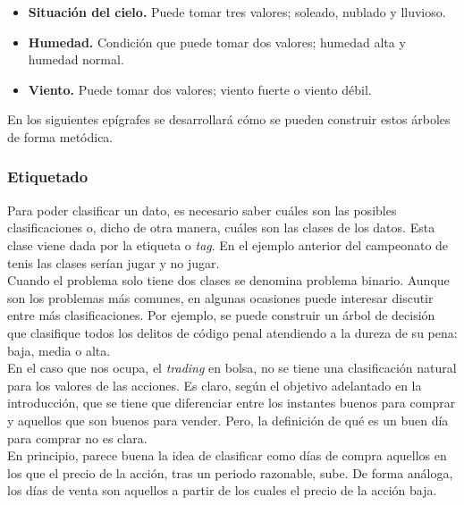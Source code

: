 			\begin{itemize}
				\item \textbf{Situaci\'on del cielo.} Puede tomar tres valores; soleado, nublado y lluvioso.
				
				\item \textbf{Humedad.} Condici\'on que puede tomar dos valores; humedad alta y humedad normal.
				
				\item \textbf{Viento.} Puede tomar dos valores; viento fuerte o viento d\'ebil.
			\end{itemize}
		
			En los siguientes ep\'igrafes se desarrollar\'a c\'omo se pueden construir estos \'arboles de forma met\'odica.\\
			 
			\subsubsection{Etiquetado}
			Para poder clasificar un dato, es necesario saber cu\'ales son las posibles clasificaciones o, dicho de otra manera, cu\'ales son las clases de los datos. Esta clase viene dada por la etiqueta o \textit{tag}. En el ejemplo anterior del campeonato de tenis las clases ser\'ian jugar y no jugar.\\
			
			Cuando el problema solo tiene dos clases se denomina problema binario. Aunque son los problemas m\'as comunes, en algunas ocasiones puede interesar discutir entre m\'as clasificaciones. Por ejemplo, se puede construir un \'arbol de decisi\'on que clasifique todos los delitos de c\'odigo penal atendiendo a la dureza de su pena: baja, media o alta.\\
			
			En el caso que nos ocupa, el \textit{trading} en bolsa, no se tiene una clasificaci\'on natural para los valores de las acciones. Es claro, seg\'un el objetivo adelantado en la introducci\'on, que se tiene que diferenciar entre los instantes buenos para comprar y aquellos que son buenos para vender. Pero, la definici\'on de qu\'e es un buen d\'ia para comprar no es clara. \\
			
			En principio, parece buena la idea de clasificar como d\'ias de compra aquellos en los que el precio de la acci\'on, tras un periodo razonable, sube. De forma an\'aloga, los d\'ias de venta son aquellos a partir de los cuales el precio de la acci\'on baja. \\
			
